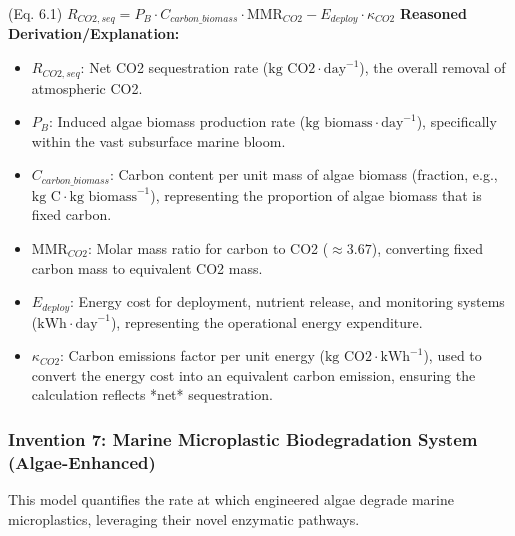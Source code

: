 \documentclass{article}
\newenvironment{reasonedderivation}{
    \textbf{Reasoned Derivation/Explanation:}
    \begin{itemize}
}{
    \end{itemize}
}
\begin{document}
(Eq. 6.1) $R_{CO2, seq} = P_B \cdot C_{carbon\_biomass} \cdot \text{MMR}_{CO2} - E_{deploy} \cdot \kappa_{CO2}$
\begin{reasonedderivation}
    \item $R_{CO2, seq}$: Net CO2 sequestration rate ($\text{kg CO2} \cdot \text{day}^{-1}$), the overall removal of atmospheric CO2.
    \item $P_B$: Induced algae biomass production rate ($\text{kg biomass} \cdot \text{day}^{-1}$), specifically within the vast subsurface marine bloom.
    \item $C_{carbon\_biomass}$: Carbon content per unit mass of algae biomass (fraction, e.g., $\text{kg C} \cdot \text{kg biomass}^{-1}$), representing the proportion of algae biomass that is fixed carbon.
    \item $\text{MMR}_{CO2}$: Molar mass ratio for carbon to CO2 ($\approx 3.67$), converting fixed carbon mass to equivalent CO2 mass.
    \item $E_{deploy}$: Energy cost for deployment, nutrient release, and monitoring systems ($\text{kWh} \cdot \text{day}^{-1}$), representing the operational energy expenditure.
    \item $\kappa_{CO2}$: Carbon emissions factor per unit energy ($\text{kg CO2} \cdot \text{kWh}^{-1}$), used to convert the energy cost into an equivalent carbon emission, ensuring the calculation reflects *net* sequestration.
\end{reasonedderivation}

\subsubsection*{Invention 7: Marine Microplastic Biodegradation System (Algae-Enhanced)}
This model quantifies the rate at which engineered algae degrade marine microplastics, leveraging their novel enzymatic pathways.
\end{document}
